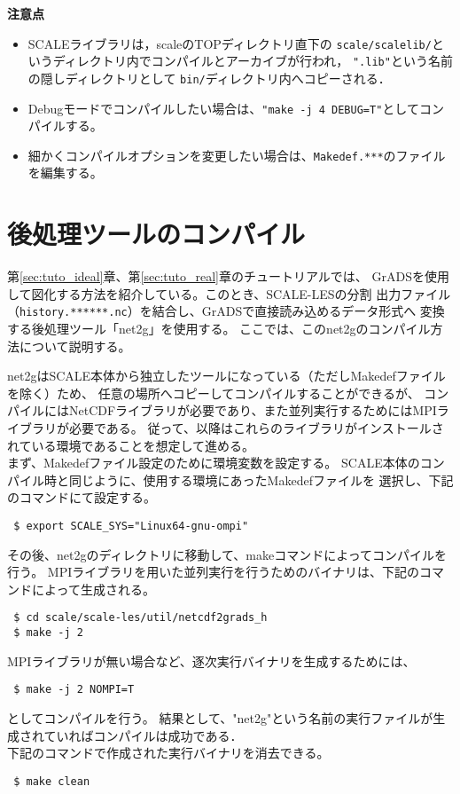 {\bf 注意点}
\begin{itemize}
\item SCALEライブラリは，scaleのTOPディレクトリ直下の
 \verb|scale/scalelib/|というディレクトリ内でコンパイルとアーカイブが行われ，
 \verb|".lib"|という名前の隠しディレクトリとして
 \verb|bin/|ディレクトリ内へコピーされる．
\item Debugモードでコンパイルしたい場合は、\verb|"make -j 4 DEBUG=T"|としてコンパイルする。
\item 細かくコンパイルオプションを変更したい場合は、\verb|Makedef.***|のファイルを編集する。
\end{itemize}


\section{後処理ツールのコンパイル} \label{sec:source_net2g}

第\ref{sec:tuto_ideal}章、第\ref{sec:tuto_real}章のチュートリアルでは、
GrADSを使用して図化する方法を紹介している。このとき、SCALE-LESの分割
出力ファイル（\verb|history.******.nc|）を結合し、GrADSで直接読み込めるデータ形式へ
変換する後処理ツール「net2g」を使用する。
ここでは、このnet2gのコンパイル方法について説明する。

net2gはSCALE本体から独立したツールになっている（ただしMakedefファイルを除く）ため、
任意の場所へコピーしてコンパイルすることができるが、
コンパイルにはNetCDFライブラリが必要であり、また並列実行するためにはMPIライブラリが必要である。
従って、以降はこれらのライブラリがインストールされている環境であることを想定して進める。\\


まず、Makedefファイル設定のために環境変数を設定する。
SCALE本体のコンパイル時と同じように、使用する環境にあったMakedefファイルを
選択し、下記のコマンドにて設定する。

\begin{verbatim}
 $ export SCALE_SYS="Linux64-gnu-ompi"
\end{verbatim}

その後、net2gのディレクトリに移動して、makeコマンドによってコンパイルを行う。
MPIライブラリを用いた並列実行を行うためのバイナリは、下記のコマンドによって生成される。
\begin{verbatim}
 $ cd scale/scale-les/util/netcdf2grads_h
 $ make -j 2
\end{verbatim}
MPIライブラリが無い場合など、逐次実行バイナリを生成するためには、\\
\begin{verbatim}
 $ make -j 2 NOMPI=T
\end{verbatim}
としてコンパイルを行う。
結果として、"net2g"という名前の実行ファイルが生成されていればコンパイルは成功である．\\

下記のコマンドで作成された実行バイナリを消去できる。
\begin{verbatim}
 $ make clean
\end{verbatim}


